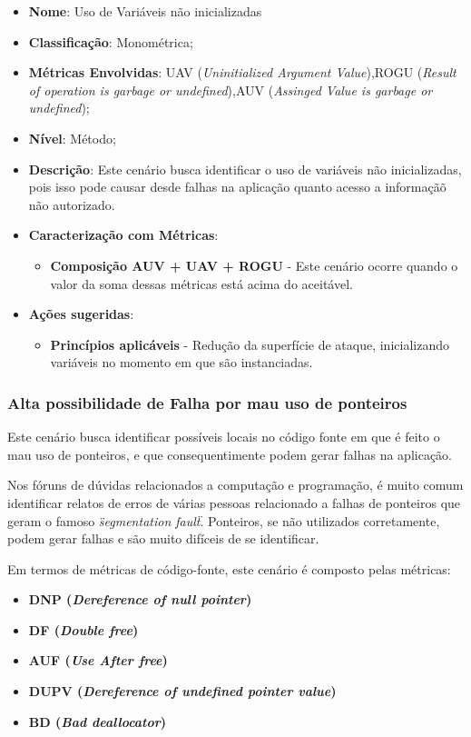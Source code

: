 \begin{itemize}
\item \textbf{Nome}: Uso de Variáveis não inicializadas
\item \textbf{Classificação}: Monométrica;
\item \textbf{Métricas Envolvidas}: UAV (\emph{Uninitialized Argument Value}),ROGU (\emph{Result of operation is garbage or undefined}),AUV (\emph{Assinged Value is garbage or undefined});
\item \textbf{Nível}: Método;
\item \textbf{Descrição}: Este cenário busca identificar o uso de variáveis não inicializadas, pois isso pode causar desde falhas na aplicação quanto acesso a informaçãõ não autorizado.
\item \textbf{Caracterização com Métricas}: 
	\begin{itemize}
	\item \textbf{Composição AUV + UAV + ROGU} - Este cenário ocorre quando o valor da soma dessas métricas está acima do aceitável.
	\end{itemize}
\item \textbf{Ações sugeridas}: 
	\begin{itemize}
	\item \textbf{Princípios aplicáveis} - Redução da superfície de ataque, inicializando variáveis no momento em que são instanciadas.
	\end{itemize}
\end{itemize}


\subsubsection{Alta possibilidade de Falha por mau uso de ponteiros}
Este cenário busca identificar possíveis locais no código fonte em que é feito o mau uso de ponteiros, e que consequentimente podem gerar falhas na aplicação. 

Nos fóruns de dúvidas relacionados a computação e programação, é muito comum identificar relatos de erros de várias pessoas relacionado a falhas de ponteiros que geram o famoso \emph{\"segmentation fault\"}. Ponteiros, se não utilizados corretamente, podem gerar falhas e são muito difíceis de se identificar.

Em termos de métricas de código-fonte, este cenário é composto pelas métricas:
\begin{itemize}
	\item \textbf{DNP (\emph{Dereference of null pointer})}
	\item \textbf{DF (\emph{Double free})}
	\item \textbf{AUF (\emph{Use After free})}
	\item \textbf{DUPV (\emph{Dereference of undefined pointer value})}
	\item \textbf{BD (\emph{Bad deallocator})}
\end{itemize}

